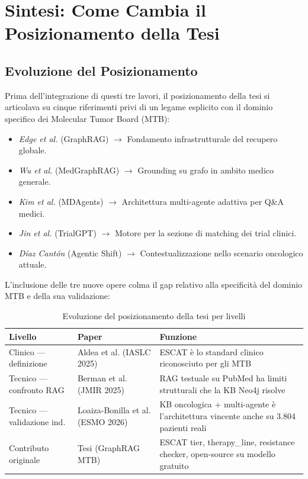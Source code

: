 \documentclass[12pt, a4paper]{article}
\begin{document}
\newpage
\section{Sintesi: Come Cambia il Posizionamento della Tesi}

\subsection{Evoluzione del Posizionamento}
Prima dell'integrazione di questi tre lavori, il posizionamento della tesi si articolava su cinque riferimenti privi di un legame esplicito con il dominio specifico dei Molecular Tumor Board (MTB):
\begin{itemize}[leftmargin=1.8em, itemsep=2pt]
  \item \textit{Edge et al.} (GraphRAG) $\rightarrow$ Fondamento infrastrutturale del recupero globale.
  \item \textit{Wu et al.} (MedGraphRAG) $\rightarrow$ Grounding su grafo in ambito medico generale.
  \item \textit{Kim et al.} (MDAgents) $\rightarrow$ Architettura multi-agente adattiva per Q\&A medici.
  \item \textit{Jin et al.} (TrialGPT) $\rightarrow$ Motore per la sezione di matching dei trial clinici.
  \item \textit{D\'iaz Cant\'on} (Agentic Shift) $\rightarrow$ Contestualizzazione nello scenario oncologico attuale.
\end{itemize}

L'inclusione delle tre nuove opere colma il gap relativo alla specificità del dominio MTB e della sua validazione:

\begin{table}[htbp]
\centering
\small
\renewcommand{\arraystretch}{1.3}
\caption{Evoluzione del posizionamento della tesi per livelli}
\begin{tabularx}{\textwidth}{>{\raggedright\arraybackslash}p{4cm} >{\raggedright\arraybackslash}p{4cm} >{\raggedright\arraybackslash}X}
\toprule
\rowcolor{primaryblue}
\color{white}\textbf{Livello} & \color{white}\textbf{Paper} & \color{white}\textbf{Funzione} \\
\midrule
Clinico --- definizione & Aldea et al. (IASLC 2025) & ESCAT è lo standard clinico riconosciuto per gli MTB \\
\rowcolor{roweven}
Tecnico --- confronto RAG & Berman et al. (JMIR 2025) & RAG testuale su PubMed ha limiti strutturali che la KB Neo4j risolve \\
Tecnico --- validazione ind. & Loaiza-Bonilla et al. (ESMO 2026) & KB oncologica + multi-agente è l'architettura vincente anche su 3.804 pazienti reali \\
\rowcolor{roweven}
Contributo originale & Tesi (GraphRAG MTB) & ESCAT tier, therapy\_line, resistance checker, open-source su modello gratuito \\
\bottomrule
\end{tabularx}
\label{tab:posizionamento}
\end{table}
\end{document}
